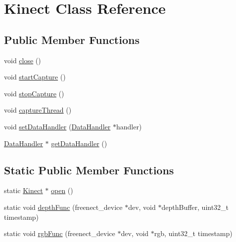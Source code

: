 \hypertarget{classKinect}{
\section{\-Kinect \-Class \-Reference}
\label{classKinect}
}
\subsection*{\-Public \-Member \-Functions}
\begin{DoxyCompactItemize}
\item 
void \hyperlink{classKinect_aef8cce7b210ad901a0c770f6def4b73d}{close} ()
\item 
void \hyperlink{classKinect_aceca210ffb72d2783cfe031f1c1919f4}{start\-Capture} ()
\item 
void \hyperlink{classKinect_a9eca40fe2513bdc89834ef445c27b47a}{stop\-Capture} ()
\item 
void \hyperlink{classKinect_ae51fd7b86da317a46134a77b9792e126}{capture\-Thread} ()
\item 
void \hyperlink{classKinect_aa666e042b2a47ec6ff6254bcd417ce55}{set\-Data\-Handler} (\hyperlink{classDataHandler}{\-Data\-Handler} $\ast$handler)
\item 
\hyperlink{classDataHandler}{\-Data\-Handler} $\ast$ \hyperlink{classKinect_aef6f34915c7e7518780d984e7d54365a}{get\-Data\-Handler} ()
\end{DoxyCompactItemize}
\subsection*{\-Static \-Public \-Member \-Functions}
\begin{DoxyCompactItemize}
\item 
static \hyperlink{classKinect}{\-Kinect} $\ast$ \hyperlink{classKinect_a49065398a7b8cf228a8dff6f0ab4e9c1}{open} ()
\item 
static void \hyperlink{classKinect_ae3b40dfb52ec7624e1e8df2e34b45e2f}{depth\-Func} (freenect\-\_\-device $\ast$dev, void $\ast$depth\-Buffer, uint32\-\_\-t timestamp)
\item 
static void \hyperlink{classKinect_a919ba42b0f9bb3bdede809441ecc3fd5}{rgb\-Func} (freenect\-\_\-device $\ast$dev, void $\ast$rgb, uint32\-\_\-t timestamp)
\end{DoxyCompactItemize}



